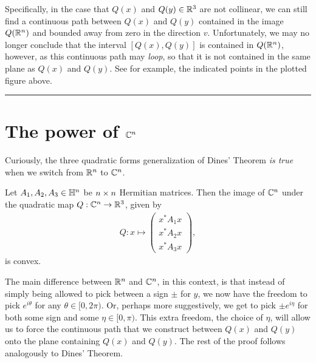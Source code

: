 \documentclass{article}
\begin{document}
Specifically, in the case that $Q(x)$ and $Q(y)\in{\mathbb{R}}^3$ are not collinear, we can still find a continuous path between $Q(x)$ and $Q(y)$ contained in the image $Q({\mathbb{R}}^n)$ and bounded away from zero in the direction $v$. Unfortunately, we may no longer conclude that the interval $[Q(x), Q(y)]$ is contained in $Q({\mathbb{R}}^n)$, however, as this continuous path may \textit{loop}, so that it is not contained in the same plane as $Q(x)$ and $Q(y)$. See for example, the indicated points in the plotted figure above.

\rule{0.5\linewidth}{\linethickness}
\section{The power of ${\mathbb{C}}^n$}

Curiously, the three quadratic forms generalization of Dines' Theorem \textit{is true} when we switch from ${\mathbb{R}}^n$ to ${\mathbb{C}}^n$.

\begin{theorem}
Let $A_1,A_2,A_3\in{\mathbb{H}}^n$ be $n\times n$ Hermitian matrices. Then the image of ${\mathbb{C}}^n$ under the quadratic map $Q:{\mathbb{C}}^n\to{\mathbb{R}}^3$, given by
\begin{align*}
Q: x\mapsto \begin{pmatrix}
	x^* A_1 x\\
	x^* A_2 x\\
	x^* A_3 x
\end{pmatrix},
\end{align*}
is convex.
\end{theorem}

The main difference between ${\mathbb{R}}^n$ and ${\mathbb{C}}^n$, in this context, is that instead of simply being allowed to pick between a sign $\pm$ for $y$, we now have the freedom to pick $e^{i\theta}$ for any $\theta\in[0,2\pi)$. Or, perhaps more suggestively, we get to pick $\pm e^{i\eta}$ for both some sign and some $\eta\in [0,\pi)$.
This extra freedom, the choice of $\eta$, will allow us to force the continuous path that we construct between $Q(x)$ and $Q(y)$ onto the plane containing $Q(x)$ and $Q(y)$.
The rest of the proof follows analogously to Dines' Theorem.

{
 

}
\end{document}
